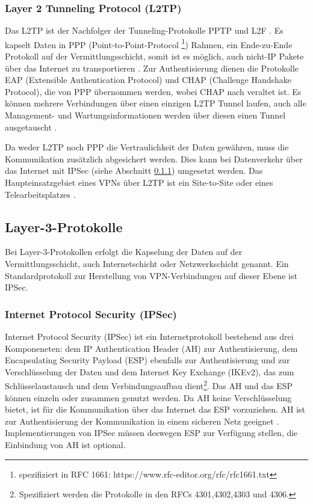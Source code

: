 \subsubsection{Layer 2 Tunneling Protocol (L2TP)}
Das L2TP ist der Nachfolger der Tunneling-Protokolle PPTP und L2F \cite{isi-vpn}. Es kapselt Daten in PPP (Point-to-Point-Protocol \footnote{spezifiziert in RFC 1661: https://www.rfc-editor.org/rfc/rfc1661.txt}) Rahmen, ein Ende-zu-Ende Protokoll auf der Vermittlungsschicht, somit ist es möglich, auch nicht-IP Pakete über das Internet zu transportieren \cite{gokulakrishnan2014survey}. Zur Authentisierung dienen die Protokolle EAP (Extensible Authentication Protocol) und CHAP (Challenge Handshake Protocol), die von PPP übernommen werden, wobei CHAP nach \cite{eckert2018sicherheit} veraltet ist. 
Es können mehrere Verbindungen über einen einzigen L2TP Tunnel laufen, auch alle Management- und Wartungsinformationen werden über diesen einen Tunnel ausgetauscht \cite{bohmer2005vpn}.

Da weder L2TP noch PPP die Vertraulichkeit der Daten gewähren, muss die Kommunikation zusätzlich abgesichert werden. Dies kann bei Datenverkehr über das Internet mit IPSec (siehe Abschnitt \ref{subsub:L3}) umgesetzt werden. 
Das Haupteinsatzgebiet eines VPNs über L2TP ist ein Site-to-Site oder eines Telearbeitsplatzes \cite{isi-vpn}.   

\subsection{Layer-3-Protokolle}

Bei Layer-3-Protokollen erfolgt die Kapselung der Daten auf der Vermittlungsschicht, auch Internetschicht oder Netzwerkschicht genannt. Ein Standardprotokoll zur Herstellung von VPN-Verbindungen auf dieser Ebene ist IPSec.

\subsubsection{Internet Protocol Security (IPSec)}
\label{subsub:L3}
Internet Protocol Security (IPSec) ist ein Internetprotokoll bestehend aus drei Komponeneten: dem IP Authentication Header (AH) zur Authentisierung, dem Encapsulating Security Payload (ESP) ebenfalls zur Authentisierung und zur Verschlüsselung der Daten und dem Internet Key Exchange (IKEv2), das zum Schlüsselaustausch und dem Verbindungsaufbau dient\footnote{Spezifiziert werden die Protokolle in den RFCs 4301,4302,4303 und 4306.}. Das AH und das ESP können einzeln oder zusammen genutzt werden. Da AH keine Verschlüsselung bietet, ist für die Kommunikation über das Internet das ESP vorzuziehen. AH ist zur Authentisierung  der Kommunikation in einem sicheren Netz geeignet \cite{isi-vpn}. Implementierungen von IPSec müssen deswegen ESP zur Verfügung stellen, die Einbindung von AH ist optional.

